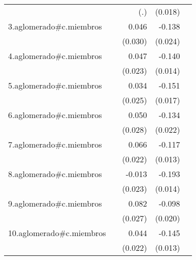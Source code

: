 {\begin{longtable}{l*{4}{D{.}{.}{-1}}}
            &                     &         (.)         &     (0.018)         &                     \\
\addlinespace
3.aglomerado#c.miembros&                     &       0.046         &      -0.138\sym{***}&                     \\
            &                     &     (0.030)         &     (0.024)         &                     \\
\addlinespace
4.aglomerado#c.miembros&                     &       0.047\sym{*}  &      -0.140\sym{***}&                     \\
            &                     &     (0.023)         &     (0.014)         &                     \\
\addlinespace
5.aglomerado#c.miembros&                     &       0.034         &      -0.151\sym{***}&                     \\
            &                     &     (0.025)         &     (0.017)         &                     \\
\addlinespace
6.aglomerado#c.miembros&                     &       0.050         &      -0.134\sym{***}&                     \\
            &                     &     (0.028)         &     (0.022)         &                     \\
\addlinespace
7.aglomerado#c.miembros&                     &       0.066\sym{**} &      -0.117\sym{***}&                     \\
            &                     &     (0.022)         &     (0.013)         &                     \\
\addlinespace
8.aglomerado#c.miembros&                     &      -0.013         &      -0.193\sym{***}&                     \\
            &                     &     (0.023)         &     (0.014)         &                     \\
\addlinespace
9.aglomerado#c.miembros&                     &       0.082\sym{**} &      -0.098\sym{***}&                     \\
            &                     &     (0.027)         &     (0.020)         &                     \\
\addlinespace
10.aglomerado#c.miembros&                     &       0.044\sym{*}  &      -0.145\sym{***}&                     \\
            &                     &     (0.022)         &     (0.013)         &                     \\

\end{longtable}}
